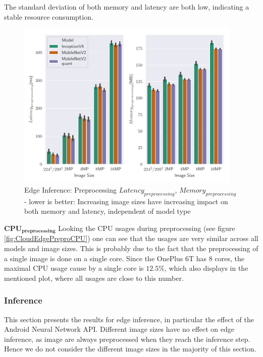 The standard deviation of both memory and latency are both low, indicating a stable resource consumption.



\begin{figure}[!htb]
\centering
\includegraphics[width=0.96\textwidth]{./Bilder/single_plots/edge_inference_plots/Edge_Inference_Preprocessing.pdf}
\caption[Edge Inference: Preprocessing $Latency_{preprocessing}$, $Memory_{preprocessing}$]{Edge Inference: Preprocessing $Latency_{preprocessing}$, $Memory_{preprocessing}$ -  lower is better: Increasing image sizes have increasing impact on both memory and latency, independent of model type}
\label{fig:EdgePrepro}
\end{figure}
$\mathbf{CPU_{preprocessing}}$
Looking the CPU usages during preprocessing (see figure \ref{fig:CloudEdgePreproCPU}) one can see that the usages are very similar across all models and image sizes. This is probably due to the fact that the preprocessing of a single image is done on a single core. Since the OnePlus 6T has $8$ cores, the maximal CPU usage cause by a single core is $12.5\%$, which also displays in the mentioned plot, where all usages are close to this number.

\FloatBarrier
\subsubsection{Inference}
This section presents the results for edge inference, in particular the effect of the Android Neural Network API.
Different image sizes have no effect on edge inference, as image are always preprocessed when they reach the inference step.
Hence we do not consider the different image sizes in the majority of this section.


